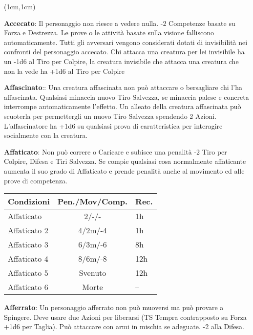\documentclass[a4paper,12 pt,openany]{book}
\begin{document}
\center

\footnotesize

\begin{textblock*}{19 cm}(1cm,1cm) %
\flushleft

\begin{multicols}{2}

\textbf{Accecato}: Il personaggio non riesce a vedere nulla. -2 Competenze basate su Forza e Destrezza. Le prove o le attività basate sulla visione falliscono automaticamente. Tutti gli avversari vengono considerati dotati di invisibilità nei confronti del personaggio accecato.  Chi attacca una creatura per lei invisibile ha un -1d6 al Tiro per Colpire, la creatura invisibile che attacca una creatura che non la vede ha +1d6 al Tiro per Colpire

\textbf{Affascinato}:: Una creatura affascinata non può attaccare o bersagliare chi l’ha affascinata. Qualsiasi minaccia nuovo Tiro Salvezza, se minaccia palese e concreta interrompe automaticamente l'effetto. Un alleato della creatura affascinata può scuoterla per permettergli un nuovo Tiro Salvezza spendendo 2 Azioni. L'affascinatore ha +1d6 su qualsiasi prova di caratteristica per interagire socialmente con la creatura.

\textbf{Affaticato}: Non può correre o Caricare e subisce una penalità -2 Tiro per Colpire, Difesa e Tiri Salvezza.
Se compie qualsiasi cosa normalmente affaticante aumenta il suo grado di Affaticato e prende penalità anche al movimento ed alle prove di competenza.

\medskip

\begin{tabularx}{0.45\textwidth}{lcl}
\textbf{Condizioni}& \textbf{Pen./Mov/Comp.}&\textbf{Rec.}\\
\hline
Affaticato &2/-/-&1h\\
Affaticato 2&4/2m/-4&1h\\
Affaticato 3&6/3m/-6&8h\\
Affaticato 4&8/6m/-8&12h\\
Affaticato 5&Svenuto&12h\\
Affaticato 6&Morte&--\\
\end{tabularx}

\medskip

\textbf{Afferrato}: Un personaggio afferrato non può muoversi ma può provare a Spingere. Deve usare due Azioni per liberarsi (TS Tempra contrapposto su Forza +1d6 per Taglia). Può attaccare con armi in mischia se adeguate. -2 alla Difesa.


\end{multicols}
\end{textblock*}
\end{document}
